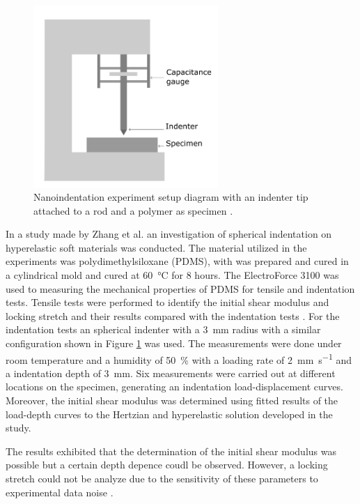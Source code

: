 \begin{figure}[th]
        \centering
        \includegraphics[width=7cm]{Images/nanoindentationbigletter}
        \caption[Nanoindentation]{Nanoindentation experiment setup diagram with an indenter tip attached to a rod and a polymer as specimen \cite{Bergström2015}.}
        \label{fig:Nanoindentation}
\end{figure}

In a study made by Zhang et al. an investigation of spherical indentation on hyperelastic 
soft materials was conducted. The material utilized in the experiments was polydimethylsiloxane (PDMS),
with was prepared and cured in a cylindrical mold and cured at \SI{60}{\degreeCelsius} for 8 hours. 
The ElectroForce 3100 was used to measuring the mechanical properties of PDMS for tensile and 
indentation tests. Tensile tests were performed to identify the initial shear modulus and 
locking stretch and their results compared with the indentation tests \cite{Zhang2014}. 
For the indentation tests an spherical indenter with a \SI{3}{\milli \m} radius with a similar configuration 
shown in Figure \ref{fig:Nanoindentation} was used. The measurements were done under room temperature and 
a humidity of \SI{50}{\percent} with a loading rate of \SI[per-mode = symbol]{2}{\milli \m\per \second} and 
a indentation depth of \SI{3}{\milli \m}. Six measurements were carried out at different 
locations on the specimen, generating an indentation load-displacement curves. 
Moreover, the initial shear modulus was determined using fitted results of the load-depth curves to 
the Hertzian and hyperelastic solution developed in the study.

The results exhibited that the determination of the initial shear modulus was possible but a 
certain depth depence coudl be observed. However, a locking stretch could not be analyze due to the 
sensitivity of these parameters to experimental data noise \cite{Zhang2014}.\\

